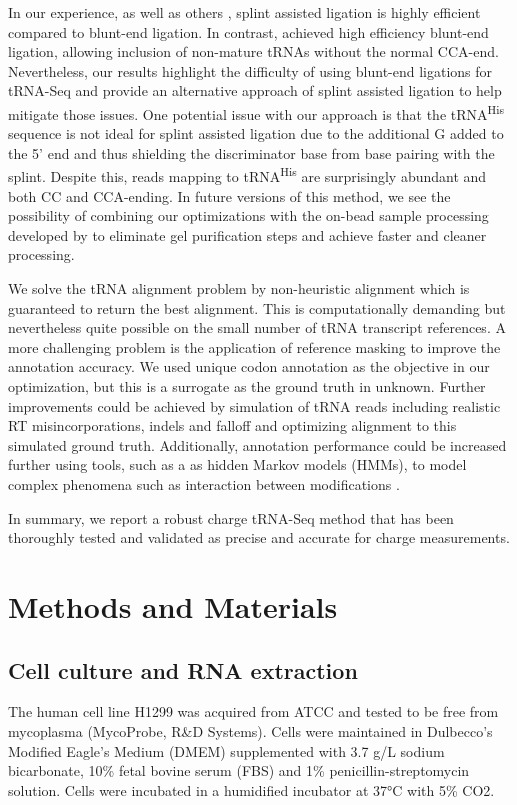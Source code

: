 \documentclass[9pt,lineno]{elife}
\begin{document}
In our experience, as well as others \citep{Shigematsu2017-tv}, splint assisted ligation is highly efficient compared to blunt-end ligation.
In contrast, \cite{Behrens2021-gb} achieved high efficiency blunt-end ligation, allowing inclusion of non-mature tRNAs without the normal CCA-end.
Nevertheless, our results highlight the difficulty of using blunt-end ligations for tRNA-Seq and provide an alternative approach of splint assisted ligation to help mitigate those issues.
One potential issue with our approach is that the tRNA\textsuperscript{His} sequence is not ideal for splint assisted ligation due to the additional G added to the 5’ end \citep{Heinemann2012-hq} and thus shielding the discriminator base from base pairing with the splint.
Despite this, reads mapping to tRNA\textsuperscript{His} are surprisingly abundant and both CC and CCA-ending.
In future versions of this method, we see the possibility of combining our optimizations with the on-bead sample processing developed by \cite{Watkins2022-er} to eliminate gel purification steps and achieve faster and cleaner processing.

We solve the tRNA alignment problem by non-heuristic alignment which is guaranteed to return the best alignment.
This is computationally demanding but nevertheless quite possible on the small number of tRNA transcript references.
A more challenging problem is the application of reference masking to improve the annotation accuracy.
We used unique codon annotation as the objective in our optimization, but this is a surrogate as the ground truth in unknown.
Further improvements could be achieved by simulation of tRNA reads including realistic RT misincorporations, indels and falloff and optimizing alignment to this simulated ground truth.
Additionally, annotation performance could be increased further using tools, such as a as hidden Markov models (HMMs), to model complex phenomena such as interaction between modifications \citep{Wang2021-fc, Hernandez-Alias2022-ch}.

In summary, we report a robust charge tRNA-Seq method that has been thoroughly tested and validated as precise and accurate for charge measurements.






\section{Methods and Materials}
\subsection{Cell culture and RNA extraction}
The human cell line H1299 was acquired from ATCC and tested to be free from mycoplasma (MycoProbe, R\&D Systems).
Cells were maintained in Dulbecco’s Modified Eagle’s Medium (DMEM) supplemented with 3.7 g/L sodium bicarbonate, 10\% fetal bovine serum (FBS) and 1\% penicillin-streptomycin solution.
Cells were incubated in a humidified incubator at 37°C with 5\% CO2.
\end{document}
